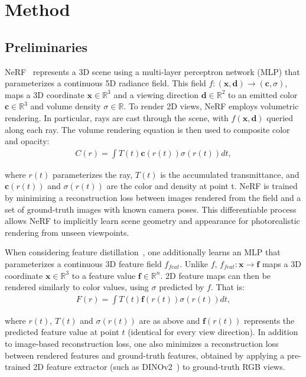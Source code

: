 \section{Method} \label{sec:method}

\subsection{Preliminaries}

NeRF~\cite{mildenhall2021nerf} represents a 3D scene using a multi-layer perceptron network (MLP) that parameterizes a continuous 5D radiance field. This field $f:(\mathbf{x}, \mathbf{d}) \rightarrow (\mathbf{c}, \sigma)$, maps a 3D coordinate $\mathbf{x} \in \mathbb{R}^3$ and a viewing direction $\mathbf{d} \in \mathbb{R}^2$ to an emitted color $\mathbf{c} \in \mathbb{R}^3$ and volume density $\sigma \in \mathbb{R}$. 
To render 2D views, NeRF employs volumetric rendering. In particular, rays are cast through the scene, with $f(\mathbf{x}, \mathbf{d})$ queried along each ray. The volume rendering equation is then used to composite color and opacity:
\begin{align}
C(r) = \int T(t) \mathbf{c} (r(t)) \sigma(r(t)) dt,
\end{align}

\noindent where $r(t)$ parameterizes the ray, $T(t)$ is the accumulated transmittance, and $\mathbf{c}(r(t))$ and $\sigma(r(t))$ are the color and density at point t.
NeRF is trained by minimizing a reconstruction loss between images rendered from the field and a set of ground-truth images with known camera poses. This differentiable process allows NeRF to implicitly learn scene geometry and appearance for photorealistic rendering from unseen viewpoints.

When considering feature distillation~\cite{kobayashi2022decomposing, kerr2023lerf, ye2023featurenerf}, one additionally learns an MLP that parameterizes a continuous 3D feature field $f_{feat}$. Unlike $f$, $f_{feat} : \mathbf{x} \rightarrow \mathbf{f}$ maps a 3D coordinate $\mathbf{x} \in \mathbb{R}^3$ to a feature value $\mathbf{f} \in \mathbb{R}^n$. 2D feature maps can then be rendered similarly to color values, using $\sigma$ predicted by $f$. That is:
\begin{align}
F(r) = \int T(t) \mathbf{f}(r(t)) \sigma(r(t)) dt,
\end{align}

\noindent where $r(t)$, $T(t)$ and $\sigma(r(t))$ are as above and $\mathbf{f}(r(t))$ represents the predicted feature value at point $t$ (identical for every view direction). In addition to image-based reconstruction loss, one also minimizes a reconstruction loss between rendered features and ground-truth features, obtained by applying a pre-trained 2D feature extractor (such as DINOv2~\cite{oquab2023dinov2}) to ground-truth RGB views. 



